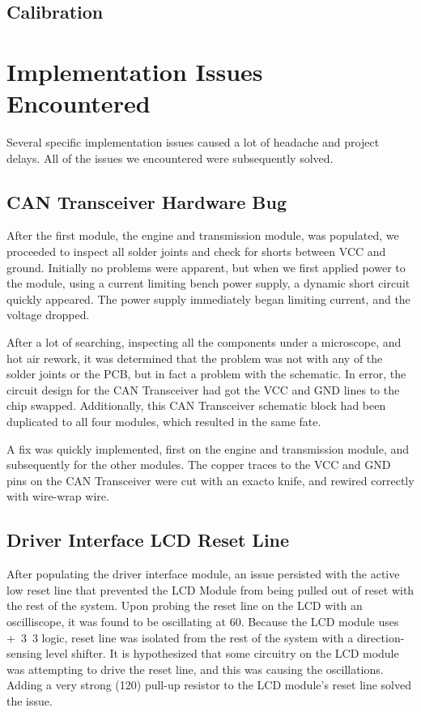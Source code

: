 \subsection{Calibration}







\section{Implementation Issues Encountered}

Several specific implementation issues caused a lot of headache and project delays. All of the issues we encountered were subsequently solved.

\subsection{CAN Transceiver Hardware Bug}

After the first module, the engine and transmission module, was populated, we proceeded to inspect all solder joints and check for shorts between VCC and ground. Initially no problems were apparent, but when we first applied power to the module, using a current limiting bench power supply, a dynamic short circuit quickly appeared. The power supply immediately began limiting current, and the voltage dropped.

After a lot of searching, inspecting all the components under a microscope, and hot air rework, it was determined that the problem was not with any of the solder joints or the PCB, but in fact a problem with the schematic. In error, the circuit design for the CAN Transceiver had got the VCC and GND lines to the chip swapped. Additionally, this CAN Transceiver schematic block had been duplicated to all four modules, which resulted in the same fate.

A fix was quickly implemented, first on the engine and transmission module, and subsequently for the other modules. The copper traces to the VCC and GND pins on the CAN Transceiver were cut with an exacto knife, and rewired correctly with wire-wrap wire.

\subsection{Driver Interface LCD Reset Line}

After populating the driver interface module, an issue persisted with the active low reset line that prevented the LCD Module from being pulled out of reset with the rest of the system. Upon probing the reset line on the LCD with an oscilliscope, it was found to be oscillating at \unit{60}{\mega\hertz}. Because the LCD module uses \unit{+3.3}{\volt} logic, reset line was isolated from the rest of the system with a direction-sensing level shifter. It is hypothesized that some circuitry on the LCD module was attempting to drive the reset line, and this was causing the oscillations. Adding a very strong (\unit{120}{\ohm}) pull-up resistor to the LCD module's reset line solved the issue.

